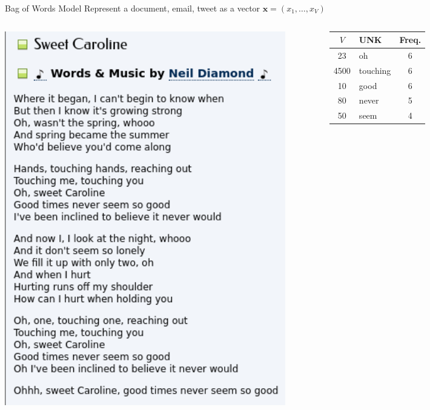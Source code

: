 \documentclass{beamer}
\newcommand{\bx}{\mathbf{x}}
\begin{document}
\begin{frame}{Bag of Words Model}
    Represent a document, email, tweet as a vector $\bx=(x_1,\ldots, x_V)$
    \begin{columns}[T]
        \begin{column}{0.6\textwidth}
            \includegraphics[width=0.9\textwidth]{sweet_caroline_lyrics.png}
        \end{column}
        \begin{column}{0.4\textwidth}
            \begin{tabular}{|c|l|c|}
                \hline
                \hline
                $V$ & UNK& Freq. \\
                \hline
                \hline
                23 & oh&6\\
                \hline
                4500 & touching&6\\
                \hline
                10 & good&6\\
                \hline
                80 & never&5\\
                \hline
                50 & seem&4\\

\end{tabular}
\end{column}
\end{columns}
\end{frame}
\end{document}
